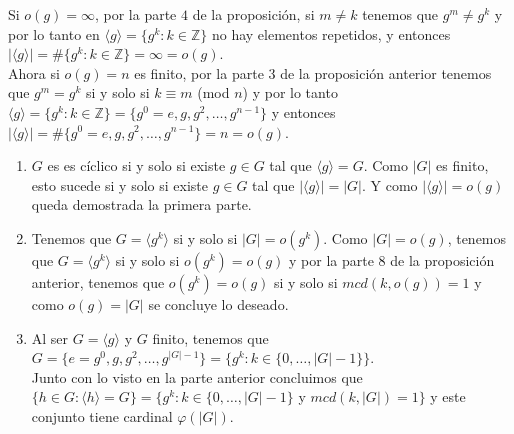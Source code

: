 \documentclass{report}
\begin{document}
\begin{myproof}
    Si $o(g)=\infty$, por la parte $4$ de la proposición, si $m\neq k$ tenemos que $g^m\neq g^k$ y por lo tanto en $\langle g\rangle=\{g^k:k\in\mathbb{Z}\}$ no hay elementos repetidos, y entonces $|\langle g\rangle |=\#\{g^k:k\in\mathbb{Z}\}=\infty=o(g)$.\\Ahora si $o(g)=n$ es finito, por la parte 3 de la proposición anterior tenemos que $g^m=g^k$ si y solo si $k\equiv m$ (mod $n$) y por lo tanto $\langle g\rangle =\{g^k:k\in\mathbb{Z}\}=\{g^0=e,g,g^2,\dots,g^{n-1}\}$ y entonces $|\langle g\rangle |=\#\{g^0=e,g,g^2,\dots,g^{n-1}\}=n=o(g)$.
\end{myproof}
\begin{myproof}
    \begin{enumerate}
        \item $G$ es es cíclico si y solo si existe $g\in G$ tal que $\langle g\rangle = G$. Como $|G|$ es finito, esto sucede si y solo si existe $g\in G$ tal que $|\langle g\rangle |=|G|$. Y como $|\langle g\rangle |=o(g)$ queda demostrada la primera parte.
        \item Tenemos que $G=\langle g^k\rangle$ si y solo si $|G|=o(g^k)$. Como $|G|=o(g)$, tenemos que $G=\langle g^k\rangle$ si y solo si $o(g^k)=o(g)$ y por la parte 8 de la proposición anterior, tenemos que $o(g^k)=o(g)$ si y solo si $mcd(k,o(g))=1$ y como $o(g)=|G|$ se concluye lo deseado.
        \item Al ser $G=\langle g\rangle$ y $G$ finito, tenemos que $G=\{e=g^0,g,g^2,\dots,g^{|G|-1}\}=\{g^k:k\in\{0,\dots,|G|-1\}\}$.\\Junto con lo visto en la parte anterior concluimos que $\{h\in G:\langle h\rangle=G\}=\{g^k:k\in\{0,\dots,|G|-1\}$ y $mcd(k,|G|)=1\}$ y este conjunto tiene cardinal $\varphi (|G|)$.
    \end{enumerate}
\end{myproof}
\end{document}
